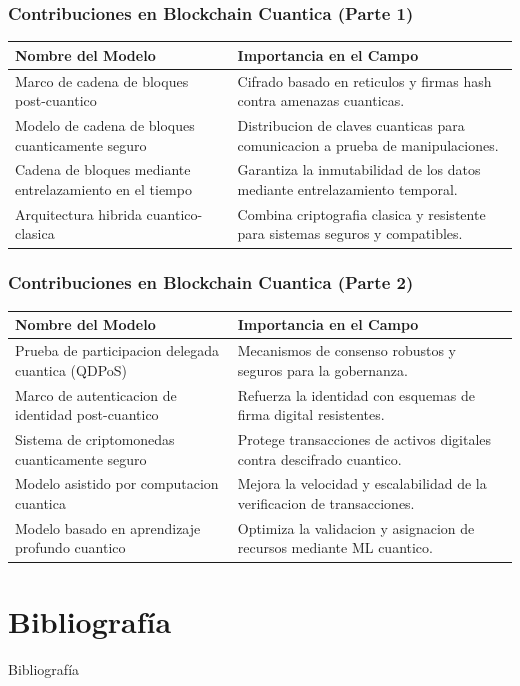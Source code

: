 \documentclass[article]{beamer}
\begin{document}
\begin{frame}
\frametitle{Contribuciones en Blockchain Cuantica (Parte 1)}

\small
\begin{tabularx}{\textwidth}{|X|X|}
\hline
Nombre del Modelo & Importancia en el Campo \\ \hline
Marco de cadena de bloques post-cuantico & Cifrado basado en reticulos y firmas hash contra amenazas cuanticas. \\ \hline
Modelo de cadena de bloques cuanticamente seguro & Distribucion de claves cuanticas para comunicacion a prueba de manipulaciones. \\ \hline
Cadena de bloques mediante entrelazamiento en el tiempo & Garantiza la inmutabilidad de los datos mediante entrelazamiento temporal. \\ \hline
Arquitectura hibrida cuantico-clasica & Combina criptografia clasica y resistente para sistemas seguros y compatibles. \\ \hline
\end{tabularx}

\end{frame}


\begin{frame}
\frametitle{Contribuciones en Blockchain Cuantica (Parte 2)}

\small
\begin{tabularx}{\textwidth}{|X|X|}
\hline
Nombre del Modelo & Importancia en el Campo \\ \hline
Prueba de participacion delegada cuantica (QDPoS) & Mecanismos de consenso robustos y seguros para la gobernanza. \\ \hline
Marco de autenticacion de identidad post-cuantico & Refuerza la identidad con esquemas de firma digital resistentes. \\ \hline
Sistema de criptomonedas cuanticamente seguro & Protege transacciones de activos digitales contra descifrado cuantico. \\ \hline
Modelo asistido por computacion cuantica & Mejora la velocidad y escalabilidad de la verificacion de transacciones. \\ \hline
Modelo basado en aprendizaje profundo cuantico & Optimiza la validacion y asignacion de recursos mediante ML cuantico. \\ \hline
\end{tabularx}

\end{frame}

\section{Bibliografía}

\begin{frame}[allowframebreaks]{Bibliografía}
    \footnotesize
    
    
\end{frame}
\end{document}
